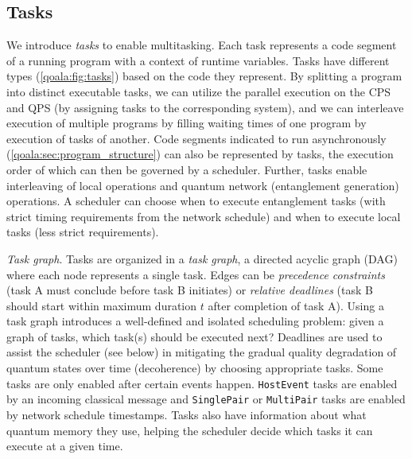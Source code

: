 \subsection{Tasks}
\label{qoala:sec:tasks}
We introduce \textit{tasks} to enable multitasking.
Each task represents a code segment of a running program with a context of runtime variables.
Tasks have different types (\cref{qoala:fig:tasks}) based on the code they represent.
By splitting a program into distinct executable tasks, 
we can utilize the parallel execution on the CPS and QPS (by assigning tasks to the corresponding system),
and we can interleave execution of multiple programs by filling waiting times of one program by execution of tasks of another.
Code segments indicated to run asynchronously (\cref{qoala:sec:program_structure}) can also be represented by tasks, the execution order of which can then be governed by a scheduler.
Further, tasks enable interleaving of local operations and quantum network (entanglement generation) operations.
A scheduler can choose when to execute entanglement tasks (with strict timing requirements from the network schedule)
and when to execute local tasks (less strict requirements).

\textit{Task graph}.
Tasks are organized in a \textit{task graph}, a directed acyclic graph (DAG) where each node represents a single task.
Edges can be \textit{precedence constraints} (task A must conclude before task B initiates) or \textit{relative deadlines} (task B should start within maximum duration $t$ after completion of task A).
Using a task graph introduces a well-defined and isolated scheduling problem: given a graph of tasks, which task(s) should be executed next?
Deadlines are used to assist the scheduler (see below) in mitigating the gradual quality degradation of quantum states over time (decoherence) by choosing appropriate tasks.
Some tasks are only enabled after certain events happen.
\texttt{HostEvent} tasks are enabled by an incoming classical message and \texttt{SinglePair} or \texttt{MultiPair} tasks are enabled by network schedule timestamps.
Tasks also have information about what quantum memory they use, helping the scheduler decide which tasks it can execute at a given time.

